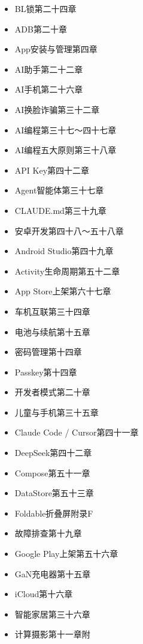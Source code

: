 


\begin{itemize}
  \item BL锁第二十四章
  \item ADB第二十章
  \item App安装与管理第四章
  \item AI助手第二十二章
  \item AI手机第二十六章
  \item AI换脸诈骗第三十二章
  \item AI编程第三十七～四十七章
  \item AI编程五大原则第三十八章
  \item API Key第四十二章
  \item Agent智能体第三十七章
  \item CLAUDE.md第三十九章
  \item 安卓开发第四十八～五十八章
  \item Android Studio第四十九章
  \item Activity生命周期第五十二章
  \item App Store上架第六十七章
\end{itemize}


\begin{itemize}
  \item 车机互联第三十四章
  \item 电池与续航第十五章
  \item 密码管理第十四章
  \item Passkey第十四章
  \item 开发者模式第二十章
  \item 儿童与手机第三十五章
  \item Claude Code / Cursor第四十一章
  \item DeepSeek第四十二章
  \item Compose第五十一章
  \item DataStore第五十三章
\end{itemize}


\begin{itemize}
  \item Foldable折叠屏附录F
  \item 故障排查第十九章
  \item Google Play上架第五十六章
  \item GaN充电器第十五章
  \item iCloud第十六章
  \item 智能家居第三十六章
  \item 计算摄影第十一章附
\end{itemize}

